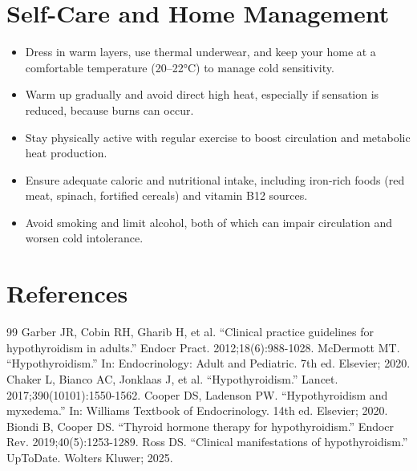 \section*{Self-Care and Home Management}
\begin{itemize}
  \item Dress in warm layers, use thermal underwear, and keep your home at a comfortable temperature (20–22°C) to manage cold sensitivity.
  \item Warm up gradually and avoid direct high heat, especially if sensation is reduced, because burns can occur.
  \item Stay physically active with regular exercise to boost circulation and metabolic heat production.
  \item Ensure adequate caloric and nutritional intake, including iron-rich foods (red meat, spinach, fortified cereals) and vitamin B12 sources.
  \item Avoid smoking and limit alcohol, both of which can impair circulation and worsen cold intolerance.
\end{itemize}

\section*{References}
\begin{thebibliography}{99}
 Garber JR, Cobin RH, Gharib H, et al. ``Clinical practice guidelines for hypothyroidism in adults.'' Endocr Pract. 2012;18(6):988-1028.
 McDermott MT. ``Hypothyroidism.'' In: Endocrinology: Adult and Pediatric. 7th ed. Elsevier; 2020.
 Chaker L, Bianco AC, Jonklaas J, et al. ``Hypothyroidism.'' Lancet. 2017;390(10101):1550-1562.
 Cooper DS, Ladenson PW. ``Hypothyroidism and myxedema.'' In: Williams Textbook of Endocrinology. 14th ed. Elsevier; 2020.
 Biondi B, Cooper DS. ``Thyroid hormone therapy for hypothyroidism.'' Endocr Rev. 2019;40(5):1253-1289.
 Ross DS. ``Clinical manifestations of hypothyroidism.'' UpToDate. Wolters Kluwer; 2025.
\end{thebibliography}
